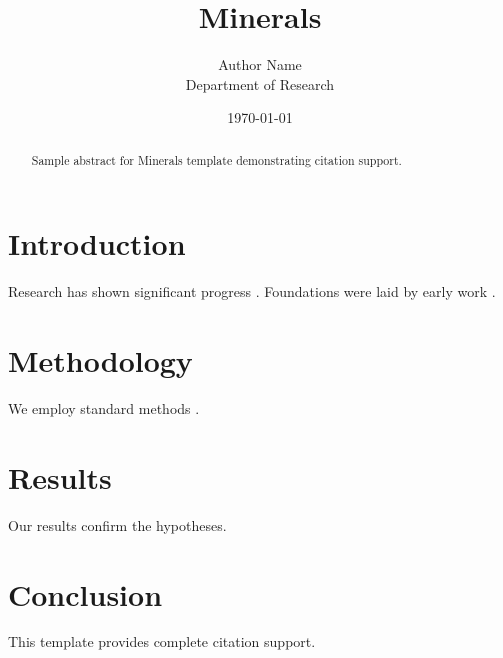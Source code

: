 \documentclass{mdpi}
\title{Minerals}
\author{Author Name \\ \small Department of Research}
\date{\today}
\begin{document}
\maketitle

\begin{abstract}
Sample abstract for Minerals template demonstrating citation support.
\end{abstract}

\section{Introduction}
Research has shown significant progress \citep{einstein1905}. Foundations were laid by early work \citep{turing1950}.

\section{Methodology}
We employ standard methods \citep{knuth1984}.

\section{Results}
Our results confirm the hypotheses.

\section{Conclusion}
This template provides complete citation support.



\end{document}
